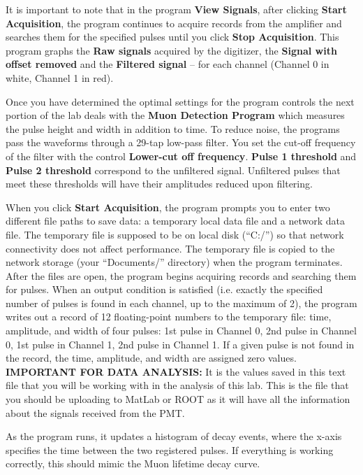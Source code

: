 \documentclass{../lab}
\begin{document}
It is important to note that in the program \textbf{View Signals}, after clicking \textbf{Start Acquisition}, the program continues to acquire records from the amplifier and searches them for the specified pulses until you click \textbf{Stop Acquisition}. This program graphs the \textbf{Raw signals} acquired by the digitizer, the \textbf{Signal with offset removed} and the \textbf{Filtered signal} -- for each channel (Channel 0 in white, Channel 1 in red).

Once you have determined the optimal settings for the program controls the next portion of the lab deals with the\textbf{ Muon Detection Program }which measures the pulse height and width in addition to time. To reduce noise, the programs pass the waveforms through a 29-tap low-pass filter. You set the cut-off frequency of the filter with the control \textbf{Lower-cut off frequency}. \textbf{Pulse 1 threshold} and \textbf{Pulse 2 threshold} correspond to the unfiltered signal. Unfiltered pulses that meet these thresholds will have their amplitudes reduced upon filtering.

When you click \textbf{Start Acquisition}, the program prompts you to enter two different file paths to save data: a temporary local data file and a network data file. The temporary file is supposed to be on local disk (``C:/'') so that network connectivity does not affect performance. The temporary file is copied to the network storage (your ``Documents/'' directory) when the program terminates. After the files are open, the program begins acquiring records and searching them for pulses. When an output condition is satisfied (i.e. exactly the specified number of pulses is found in each channel, up to the maximum of 2), the program writes out a record of 12 floating-point numbers to the temporary file: time, amplitude, and width of four pulses: 1st pulse in Channel 0, 2nd pulse in Channel 0, 1st pulse in Channel 1, 2nd pulse in Channel 1. If a given pulse is not found in the record, the time, amplitude, and width are assigned zero values. \textbf{IMPORTANT FOR DATA ANALYSIS:} It is the values saved in this text file that you will be working with in the analysis of this lab. This is the file that you should be uploading to MatLab or ROOT as it will have all the information about the signals received from the PMT.

As the program runs, it updates a histogram of decay events, where the x-axis specifies the time between the two registered pulses. If everything is working correctly, this should mimic the Muon lifetime decay curve.
\end{document}
